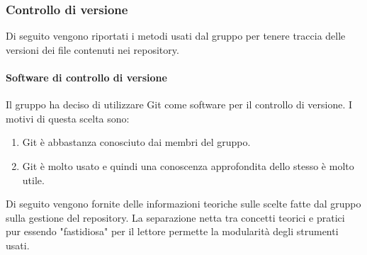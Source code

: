 \subsubsection{Controllo di versione}
Di seguito vengono riportati i metodi usati dal gruppo per tenere traccia delle versioni dei file contenuti nei repository.

\paragraph{Software di controllo di versione}
Il gruppo ha deciso di utilizzare Git come software per il controllo di versione.
I motivi di questa scelta sono:
\begin{enumerate}
    \item Git è abbastanza conosciuto dai membri del gruppo.
    \item Git è molto usato e quindi una conoscenza approfondita dello stesso è molto utile.
\end{enumerate}
Di seguito vengono fornite delle informazioni teoriche sulle scelte fatte dal gruppo sulla gestione del repository.
La separazione netta tra concetti teorici e pratici pur essendo "fastidiosa" per il lettore permette la modularità degli strumenti usati.

